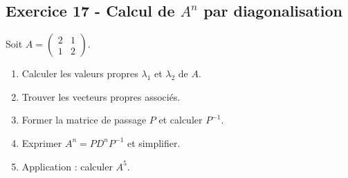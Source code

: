 \documentclass[12pt,a4paper]{article}
\begin{document}
\subsection*{Exercice 17 - Calcul de $A^n$ par diagonalisation \niveau{\moyen}}
\begin{boiteexercice}
Soit $A = \begin{pmatrix}2&1\\1&2\end{pmatrix}$.

\begin{enumerate}
  \item Calculer les valeurs propres $\lambda_1$ et $\lambda_2$ de $A$.
  \item Trouver les vecteurs propres associés.
  \item Former la matrice de passage $P$ et calculer $P^{-1}$.
  \item Exprimer $A^n = PD^nP^{-1}$ et simplifier.
  \item Application : calculer $A^5$.
\end{enumerate}
\end{boiteexercice}
\end{document}
